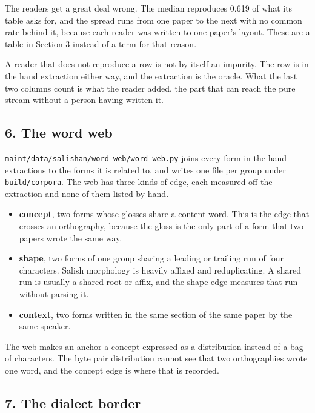 The readers get a great deal wrong. The median reproduces 0.619 of what its table asks for, and the spread runs from one paper to the next with no common rate behind it, because each reader was written to one paper's layout. These are a table in Section 3 instead of a term for that reason.

A reader that does not reproduce a row is not by itself an impurity. The row is in the hand extraction either way, and the extraction is the oracle. What the last two columns count is what the reader added, the part that can reach the pure stream without a person having written it.

\subsection{6. The word web}

\texttt{maint/\allowbreak{}data/\allowbreak{}salishan/\allowbreak{}word\_\allowbreak{}web/\allowbreak{}word\_\allowbreak{}web.\allowbreak{}py} joins every form in the hand extractions to the forms it is related to, and writes one file per group under \texttt{build/\allowbreak{}corpora}. The web has three kinds of edge, each measured off the extraction and none of them listed by hand.

\begin{itemize}
\item \textbf{concept}, two forms whose glosses share a content word. This is the edge that crosses an orthography, because the gloss is the only part of a form that two papers wrote the same way.
\item \textbf{shape}, two forms of one group sharing a leading or trailing run of four characters. Salish morphology is heavily affixed and reduplicating. A shared run is usually a shared root or affix, and the shape edge measures that run without parsing it.
\item \textbf{context}, two forms written in the same section of the same paper by the same speaker.
\end{itemize}

The web makes an anchor a concept expressed as a distribution instead of a bag of characters. The byte pair distribution cannot see that two orthographies wrote one word, and the concept edge is where that is recorded.

\subsection{7. The dialect border}

